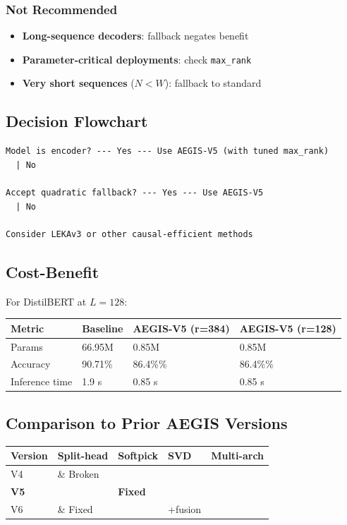 \subsubsection{Not Recommended}
\begin{itemize}
\item \textbf{Long-sequence decoders}: fallback negates benefit
\item \textbf{Parameter-critical deployments}: check \texttt{max\_rank}
\item \textbf{Very short sequences} ($N < W$): fallback to standard

\end{itemize}
\subsection{Decision Flowchart}

\begin{lstlisting}
Model is encoder? --- Yes --- Use AEGIS-V5 (with tuned max_rank)
  | No
   
Accept quadratic fallback? --- Yes --- Use AEGIS-V5
  | No
   
Consider LEKAv3 or other causal-efficient methods
\end{lstlisting}

\subsection{Cost-Benefit}

For DistilBERT at $L = 128$:

\begin{table}[H]
\centering
\small
\begin{tabular}{llll}
\toprule
\textbf{Metric} & \textbf{Baseline} & \textbf{AEGIS-V5 (r=384)} & \textbf{AEGIS-V5 (r=128)} \\
\midrule
Params & 66.95M & 0.85M & 0.85M \\
Accuracy & 90.71\% & 86.4\%\% & 86.4\%\% \\
Inference time & 1.9 s & 0.85 s & 0.85 s \\
\bottomrule
\end{tabular}
\end{table}

\subsection{Comparison to Prior AEGIS Versions}

\begin{table}[H]
\centering
\small
\begin{tabular}{lllll}
\toprule
\textbf{Version} & \textbf{Split-head} & \textbf{Softpick} & \textbf{SVD} & \textbf{Multi-arch} \\
\midrule
V4 &  \& Broken &  &  \\
\textbf{V5} & \textbf{ } & \textbf{Fixed} & \textbf{ } & \textbf{ } \\
V6 &  \& Fixed &  & +fusion \\
\bottomrule
\end{tabular}
\end{table}


